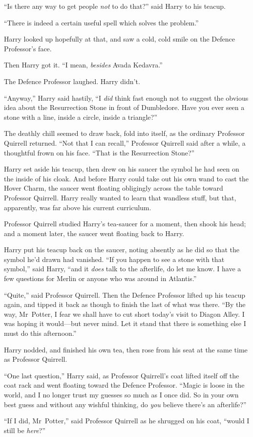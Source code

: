 “Is there any way to get people \emph{not} to do that?” said Harry to his teacup.

“There is indeed a certain useful spell which solves the problem.”

Harry looked up hopefully at that, and saw a cold, cold smile on the Defence Professor’s face.

Then Harry got it. “I mean, \emph{besides} Avada Kedavra.”

The Defence Professor laughed. Harry didn’t.

“Anyway,” Harry said hastily, “I \emph{did} think fast enough not to suggest the obvious idea about the Resurrection Stone in front of Dumbledore. Have you ever seen a stone with a line, inside a circle, inside a triangle?”

The deathly chill seemed to draw back, fold into itself, as the ordinary Professor Quirrell returned. “Not that I can recall,” Professor Quirrell said after a while, a thoughtful frown on his face. “That is the Resurrection Stone?”

Harry set aside his teacup, then drew on his saucer the symbol he had seen on the inside of his cloak. And before Harry could take out his own wand to cast the Hover Charm, the saucer went floating obligingly across the table toward Professor Quirrell. Harry really wanted to learn that wandless stuff, but that, apparently, was far above his current curriculum.

Professor Quirrell studied Harry’s tea-saucer for a moment, then shook his head; and a moment later, the saucer went floating back to Harry.

Harry put his teacup back on the saucer, noting absently as he did so that the symbol he’d drawn had vanished. “If you happen to see a stone with that symbol,” said Harry, “and it \emph{does} talk to the afterlife, do let me know. I have a few questions for Merlin or anyone who was around in Atlantis.”

“Quite,” said Professor Quirrell. Then the Defence Professor lifted up his teacup again, and tipped it back as though to finish the last of what was there. “By the way, Mr~Potter, I fear we shall have to cut short today’s visit to Diagon Alley. I was hoping it would—but never mind. Let it stand that there is something else I must do this afternoon.”

Harry nodded, and finished his own tea, then rose from his seat at the same time as Professor Quirrell.

“One last question,” Harry said, as Professor Quirrell’s coat lifted itself off the coat rack and went floating toward the Defence Professor. “Magic is loose in the world, and I no longer trust my guesses so much as I once did. So in your own best guess and without any wishful thinking, do \emph{you} believe there’s an afterlife?”

“If I did, Mr~Potter,” said Professor Quirrell as he shrugged on his coat, “would I still be \emph{here}?”

